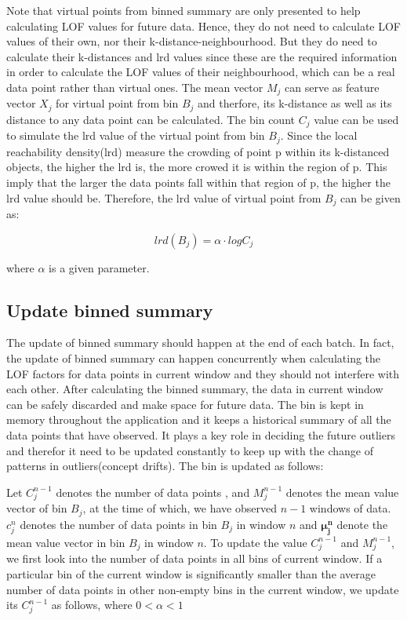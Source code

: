 \documentclass[11pt]{article}       %
\begin{document}
Note that virtual points from binned summary are only presented to help calculating LOF values for future data. Hence, they do not need to calculate LOF values of their own, nor their k-distance-neighbourhood. But they do need to calculate their k-distances and lrd values since these are the required information in order to calculate the LOF values of their neighbourhood, which can be a real data point rather than virtual ones. The mean vector $M_j$ can serve as feature vector $X_j$ for virtual point from bin $B_j$ and therfore, its k-distance as well as its distance to any data point can be calculated. The bin count $C_j$ value can be used to simulate the lrd value of the virtual point from bin $B_j$. Since the local reachability density(lrd) measure the crowding of point p within its k-distanced objects, the higher the lrd is, the more crowed it is within the region of p. This imply that the larger the data points fall within that region of p, the higher the lrd value should be. Therefore, the lrd value of virtual point from $B_j$ can be given as:

\begin{equation} \label{vir_lrd}
	lrd(B_j) = \alpha \cdot log C_j 
\end{equation}

where $\alpha$ is a given parameter.


\subsection{Update binned summary} \label{subsect4}

The update of binned summary should happen at the end of each batch. In fact, the update of binned summary can happen concurrently when calculating the LOF factors for data points in current window and they should not interfere with each other. After calculating the binned summary, the data in current window can be safely discarded and make space for future data. The bin is kept in memory throughout the application and it keeps a historical summary of all the data points that have observed. It plays a key role in deciding the future outliers and therefor it need to be updated constantly to keep up with the change of patterns in outliers(concept drifts). The bin is updated as follows:

Let $C_{j}^{n-1}$ denotes the number of data points , and $M_{j}^{n-1}$ denotes the mean value vector of bin $B_j$, at the time of which, we have observed $n-1$ windows of data. $c_{j}^{n}$ denotes the number of data points in bin $B_j$ in window $n$ and $\mathbf{\mu_j^n}$ denote the mean value vector in bin $B_j$ in window $n$. To update the value $C_{j}^{n-1}$ and $M_{j}^{n-1}$, we first look into the number of data points in all bins of current window. If a particular bin of the current window is significantly smaller than the average number of data points in other non-empty bins in the current window, we update its $C_{j}^{n-1}$ as follows, where $0 < \alpha < 1$  
\end{document}
